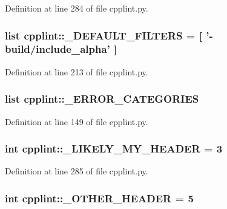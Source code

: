 Definition at line 284 of file cpplint.py.

\hypertarget{namespacecpplint_a40307223380a2e065996f7113e2f8f4c}{
\subsubsection[{\_\-DEFAULT\_\-FILTERS}]{\setlength{\rightskip}{0pt plus 5cm}list {\bf cpplint::\_\-DEFAULT\_\-FILTERS} = \mbox{[} '-\/build/include\_\-alpha' \mbox{]}}}
\label{namespacecpplint_a40307223380a2e065996f7113e2f8f4c}


Definition at line 213 of file cpplint.py.

\hypertarget{namespacecpplint_a7a498bc09903cee9029cccc023641ede}{
\subsubsection[{\_\-ERROR\_\-CATEGORIES}]{\setlength{\rightskip}{0pt plus 5cm}list {\bf cpplint::\_\-ERROR\_\-CATEGORIES}}}
\label{namespacecpplint_a7a498bc09903cee9029cccc023641ede}


Definition at line 149 of file cpplint.py.

\hypertarget{namespacecpplint_a5d6aba92ab2575ff645a1aacad5b5216}{
\subsubsection[{\_\-LIKELY\_\-MY\_\-HEADER}]{\setlength{\rightskip}{0pt plus 5cm}int {\bf cpplint::\_\-LIKELY\_\-MY\_\-HEADER} = 3}}
\label{namespacecpplint_a5d6aba92ab2575ff645a1aacad5b5216}


Definition at line 285 of file cpplint.py.

\hypertarget{namespacecpplint_ace812856f1cd6c6b4375ab5c92294323}{
\subsubsection[{\_\-OTHER\_\-HEADER}]{\setlength{\rightskip}{0pt plus 5cm}int {\bf cpplint::\_\-OTHER\_\-HEADER} = 5}}
\label{namespacecpplint_ace812856f1cd6c6b4375ab5c92294323}


